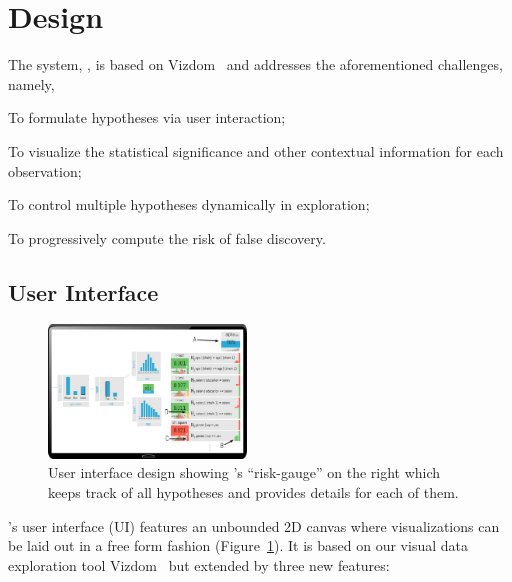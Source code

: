 \section{Design}
\label{sec:design}

The system, \system{}, is based on Vizdom~\cite{vizdom} and addresses the aforementioned challenges, namely,
\begin{itemize*}
    \item To formulate hypotheses via user interaction;
    \item To visualize the statistical significance and other contextual information for each observation;
    \item To control multiple hypotheses dynamically in exploration;
    \item To progressively compute the risk of false discovery.
\end{itemize*}

\subsection{User Interface}
\label{sec:ui}

\begin{figure}
\centering
\includegraphics[width=0.47\textwidth]{figures/ui.pdf}
\caption{User interface design showing \system{}'s ``risk-gauge'' on the right which keeps track of all hypotheses and provides details for each of them.}
\label{fig:ui}	
\vspace{-4ex}
\end{figure}

\system{}'s user interface (UI) features an unbounded 2D canvas where visualizations can be laid out in a free form fashion (Figure~\ref{fig:ui}). It is based on our visual data exploration tool Vizdom~\cite{vizdom} but extended by three new features:

